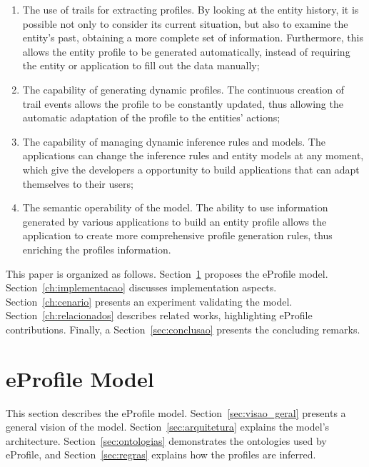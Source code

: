 \documentclass{svjour3}                     %
\begin{document}
\begin{enumerate}
  \item The use of trails for extracting profiles. By looking at the entity history, it is possible not only to consider its current situation, but also to examine the entity's past, obtaining a more complete set of information. Furthermore, this allows the entity profile to be generated automatically, instead of requiring the entity or application to fill out the data manually;
  \item The capability of generating dynamic profiles. The continuous creation of trail events allows the profile to be constantly updated, thus allowing the automatic adaptation of the profile to the entities' actions; 
  \item The capability of managing dynamic inference rules and models. The applications can change the inference rules and entity models at any moment, which give the developers a opportunity to build applications that can adapt themselves to their users;
  \item The semantic operability of the model. The ability to use information generated by various applications to build an entity profile allows the application to create more comprehensive profile generation rules, thus enriching the profiles information.
\end{enumerate}

This paper is organized as follows. Section~\ref{ch:modelo} proposes the eProfile model. Section~\ref{ch:implementacao} discusses implementation aspects. Section~\ref{ch:cenario} presents an experiment validating the model. Section~\ref{ch:relacionados} describes related works, highlighting eProfile contributions. Finally, a Section~\ref{sec:conclusao} presents the concluding remarks.


\section{eProfile Model}
\label{ch:modelo}


This section describes the eProfile model. Section~\ref{sec:visao_geral}
presents a general vision of the model. Section~\ref{sec:arquitetura} explains
the model's architecture. Section~\ref{sec:ontologias} demonstrates the
ontologies used by eProfile, and Section~\ref{sec:regras} explains how the
profiles are inferred.
\end{document}
